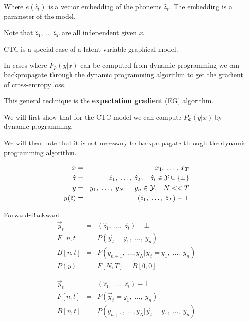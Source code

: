 {\vfill
Where $e(\hat{z}_t)$ is a vector embedding of the phoneme $\hat{z}_t$.  The embedding is a parameter of the model.

\vfill
Note that $\hat{z}_1$, $\ldots$ $\hat{z}_T$ are all independent given $x$.


CTC is a special case of a latent variable graphical model.

\vfill
In cases where $P_\Phi(y|x)$ can be computed from dynamic programming
we can backpropagate through the dynamic programming algorithm to get the gradient of cross-entropy loss.

\vfill
This general technique is the {\bf expectation gradient} (EG) algorithm.

\vfill
We will first show that for the CTC model we can compute $P_\Phi(y|x)$ by
dynamic programming.

\vfill
We will then note that it is not necessary to backpropagate through the dynamic programming algorithm.

\begin{eqnarray*}
  x & = & x_1,\;\ldots,\; x_T \\
  \hat{z} & = & \hat{z}_1, \;\ldots,\;\hat{z}_T,\;\;\;\hat{z}_t \in {\cal Y}\cup \{\bot\} \\
  y & = & y_1,\;\ldots,\;y_N,\;\;\;\;y_n \in {\cal Y},\;\;\;N << T \\
  y(\hat{z}) & = & (\hat{z}_1,\;\ldots,\;\hat{z}_T) - \bot
\end{eqnarray*}

\vfill

Forward-Backward
\begin{eqnarray*}
  \vec{y}_t & = & (\hat{z}_1,\;\ldots,\;\hat{z}_t)-\bot \\
  F[n,t] & = & P(\vec{y}_t = y_1,\;\ldots,\;y_n) \\
  B[n,t] & = & P(y_{n+1},\;\ldots,y_N | \vec{y}_t = y_1,\;\ldots,\;y_n) \\
  P(y) & = & F[N,T] = B[0,0]
\end{eqnarray*}




\begin{eqnarray*}
  \vec{y}_t & = & (\hat{z}_1,\;\ldots,\;\hat{z}_t)-\bot \\
  F[n,t] & = & P(\vec{y}_t = y_1,\;\ldots,\;y_n) \\
  B[n,t] & = & P(y_{n+1},\;\ldots,y_N | \vec{y}_t = y_1,\;\ldots,\;y_n)
\end{eqnarray*}

}
